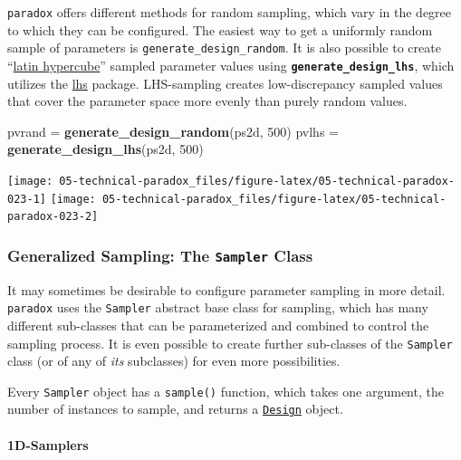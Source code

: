 \documentclass[]{scrbook}
\newenvironment{Shaded}{\begin{snugshade}}{\end{snugshade}}
\newcommand{\DecValTok}[1]{\textcolor[rgb]{0.00,0.00,0.81}{#1}}
\newcommand{\KeywordTok}[1]{\textcolor[rgb]{0.13,0.29,0.53}{\textbf{#1}}}
\newcommand{\NormalTok}[1]{#1}
\newcommand{\StringTok}[1]{\textcolor[rgb]{0.31,0.60,0.02}{#1}}
\let\oldparagraph\paragraph
\renewcommand{\paragraph}[1]{\oldparagraph{#1}\mbox{}}
\renewenvironment{Shaded} {\begin{snugshade}\small} {\end{snugshade}}
\begin{document}
\texttt{paradox} offers different methods for random sampling, which vary in the degree to which they can be configured.
The easiest way to get a uniformly random sample of parameters is \texttt{generate\_design\_random}.
It is also possible to create ``\href{https://en.wikipedia.org/wiki/Latin_hypercube_sampling}{latin hypercube}'' sampled parameter values using \textbf{\texttt{generate\_design\_lhs}}, which utilizes the \href{https://cran.r-project.org/package=lhs}{lhs} package.
LHS-sampling creates low-discrepancy sampled values that cover the parameter space more evenly than purely random values.

\begin{Shaded}
\begin{Highlighting}[]
\NormalTok{pvrand =}\StringTok{ }\KeywordTok{generate_design_random}\NormalTok{(ps2d, }\DecValTok{500}\NormalTok{)}
\NormalTok{pvlhs =}\StringTok{ }\KeywordTok{generate_design_lhs}\NormalTok{(ps2d, }\DecValTok{500}\NormalTok{)}
\end{Highlighting}
\end{Shaded}

\begin{center}\texttt{[image: 05-technical-paradox\_files/figure-latex/05-technical-paradox-023-1]} \texttt{[image: 05-technical-paradox\_files/figure-latex/05-technical-paradox-023-2]} \end{center}

\hypertarget{generalized-sampling-the-sampler-class}{%
\subsubsection{\texorpdfstring{Generalized Sampling: The \texttt{Sampler} Class}{Generalized Sampling: The Sampler Class}}\label{generalized-sampling-the-sampler-class}}

It may sometimes be desirable to configure parameter sampling in more detail.
\texttt{paradox} uses the \texttt{Sampler} abstract base class for sampling, which has many different sub-classes that can be parameterized and combined to control the sampling process.
It is even possible to create further sub-classes of the \texttt{Sampler} class (or of any of \emph{its} subclasses) for even more possibilities.

Every \texttt{Sampler} object has a \texttt{sample()} function, which takes one argument, the number of instances to sample, and returns a \protect\hyperlink{parameter-designs}{\texttt{Design}} object.

\hypertarget{d-samplers}{%
\paragraph{1D-Samplers}\label{d-samplers}}
\end{document}
